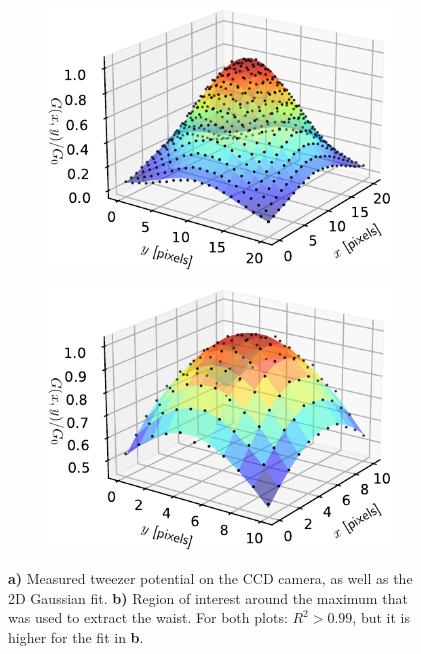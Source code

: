 \begin{figure}
\centering
	\begin{subfigure}{.49\textwidth}
	    \centering
		\includegraphics[width=0.96\linewidth]{figures/3DSpotFitGaussian.pdf}
		\caption{}
		\label{fig:3Dshowing}
	\end{subfigure}
	\begin{subfigure}{.49\textwidth}
		\centering
		\includegraphics[width=0.96\linewidth]{figures/3DSpotFitGaussianSmaller.pdf}
		\caption{}
		\label{fig:3Dwaistfit}
	\end{subfigure}
	\caption{\textbf{a)} Measured tweezer potential on the CCD camera, as well as the 2D Gaussian fit.
	\textbf{b)} Region of interest around the maximum that was used to extract the waist. For both plots: $R^2>0.99$, but it is higher for the fit in \textbf{b}.}
	\label{fig:3Dfits}
\end{figure}


